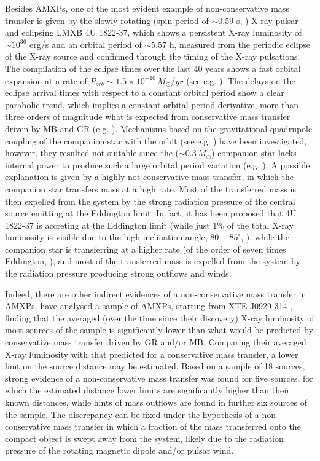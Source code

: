 \documentclass[graybox]{svmult}
\begin{document}
Besides AMXPs, one of the most evident example of non-conservative mass transfer is given by the slowly rotating (spin period of $\sim 0.59$ s, \cite{Jonker2001}) X-ray pulsar and eclipsing LMXB 4U 1822-37, which shows a persistent X-ray luminosity of $\sim 10^{36}$ erg/s and an orbital period of $\sim 5.57$ h, measured from the periodic eclipse of the X-ray source and confirmed through the timing of the X-ray pulsations. The compilation of the eclipse times over the last 40 years shows a fast orbital expansion at a rate of $\dot P_{orb} \sim 1.5 \times 10^{-10}\, M_\odot/yr$ (see e.g. \cite{Chou2016,Mazzola2019}). The delays on the eclipse arrival times with respect to a constant orbital period show a clear parabolic trend, which implies a constant orbital period derivative, more than three orders of magnitude what is expected from conservative mass transfer driven by MB and GR (e.g. \cite{Burderi2010,Iaria2011}). Mechanisms based on the gravitational quadrupole coupling of the companion star with the orbit (see e.g. \cite{Applegate1992,Applegate1994}) have been investigated, however, they resulted not suitable since the ($\sim 0.3\, M_\odot$) companion star lacks internal power to produce such a large orbital period variation (e.g. \cite{Mazzola2019}). 
%
A possible explanation is given by a highly not conservative mass transfer, in which the companion star transfers mass at a high rate. Most of the transferred mass is then expelled from the system by the strong radiation pressure of the central source emitting at the Eddington limit. In fact, it has been proposed that 4U 1822-37 is accreting at the Eddington limit (while just 1\% of the total X-ray luminosity is visible due to the high inclination angle, $80-85^\circ$, \cite{Iaria2011}), while the companion star is transferring at a higher rate (of the order of seven times Eddington, \cite{Burderi2010}), and most of the transferred mass is expelled from the system by the radiation pressure producing strong outflows and winds. 

Indeed, there are other indirect evidences of a non-conservative mass transfer in AMXPs. \cite{Marino2019} have analysed a sample of AMXPs, starting from XTE J0929-314 \cite{Marino2017}, finding that the averaged (over the time since their discovery) X-ray luminosity of most sources of the sample is significantly lower than what would be predicted by conservative mass transfer driven by GR and/or MB. Comparing their averaged X-ray luminosity with that predicted for a conservative mass transfer, a lower limt on the source distance may be estimated. Based on a sample of 18 sources, strong evidence of a non-conservative mass transfer was found for five sources, for which the estimated distance lower limits are significantly higher than their known distances, while hints of mass outflows are found in further six sources of the sample. The discrepancy can be fixed under the hypothesis of a non-conservative mass transfer in which a fraction of the mass transferred onto the compact object is swept away from the system, likely due to the radiation pressure of the rotating magnetic dipole and/or pulsar wind.
\end{document}
